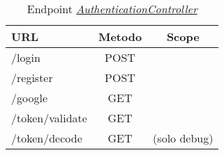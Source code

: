 \label{server:auth-controller}
\begin{table}[H]
	\ttfamily
	\caption{Endpoint \hyperref[server:auth-controller]{\textit{AuthenticationController}}}
	\centering
	\label{table:api:auth-controller}
	\begin{tabular}{l c c}    
		URL  & Metodo & Scope \\ 
		\midrule
		/login & POST &  \\
		/register & POST &  \\
		/google & GET &  \\
		/token/validate & GET  &  \\
		/token/decode & GET  & (solo debug)  \\
		\bottomrule
	\end{tabular}
\end{table}
